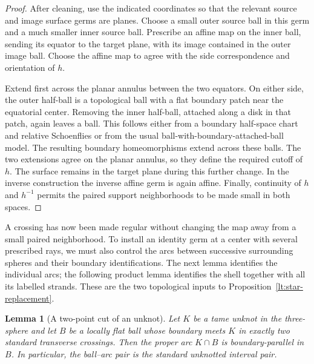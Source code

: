 \documentclass[11pt]{article}
\numberwithin{equation}{section}
\newtheorem{lemma}[theorem]{Lemma}
\theoremstyle{definition}
\theoremstyle{remark}
\begin{document}
\begin{proof}
After cleaning, use the indicated coordinates so that the relevant
source and image surface germs are planes.  Choose a small outer source
ball in this germ and a much smaller inner source ball.  Prescribe an
affine map on the inner ball, sending its equator to the target plane,
with its image contained in the outer image ball.  Choose the affine
map to agree with the side correspondence and orientation of $h$.

Extend first across the planar annulus between the two equators.
On either side, the outer half-ball is a topological ball with a flat
boundary patch near the equatorial center.  Removing the inner
half-ball, attached along a disk in that patch, again leaves a ball.
This follows either from a boundary half-space chart and relative
Schoenflies or from the usual ball-with-boundary-attached-ball model.
The resulting boundary homeomorphisms extend across these balls.
The two extensions agree on the planar annulus, so they define the
required cutoff of $h$.  The surface remains in the target plane during
this further change.  In the inverse construction the inverse affine
germ is again affine.  Finally, continuity of $h$ and $h^{-1}$ permits
the paired support neighborhoods to be made small in both spaces.
\end{proof}

A crossing has now been made regular without changing the map away
from a small paired neighborhood. To install an identity germ at a
center with several prescribed rays, we must also control the arcs
between successive surrounding spheres and their boundary
identifications. The next lemma identifies the individual arcs; the
following product lemma identifies the shell together with all its
labelled strands. These are the two topological inputs to
Proposition~\ref{lt:star-replacement}.

\begin{lemma}[A two-point cut of an unknot]\label{lt:unknot-cut}
Let $K$ be a tame unknot in the three-sphere and let $B$ be a locally
flat ball whose boundary meets $K$ in exactly two standard transverse
crossings.  Then the proper arc $K\cap B$ is boundary-parallel in $B$.
In particular, the ball--arc pair is the standard unknotted interval
pair.
\end{lemma}
\end{document}
